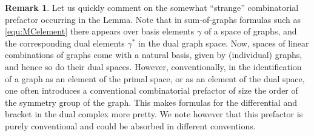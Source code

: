 \documentclass[a4paper]{amsart}
\theoremstyle{plain}
\theoremstyle{definition}
\newtheorem{rem}[thm]{Remark}
\begin{document}
\begin{rem}
 Let us quickly comment on the somewhat ``strange'' combinatorial prefactor occurring in the Lemma.
Note that in sum-of-graphs formulas such as \eqref{equ:MCelement} there appears over basis elements $\gamma$ of a space of graphs, and the corresponding dual elements $\gamma^*$ in the dual graph space.
Now, spaces of linear combinations of graphs come with a natural basis, given by (individual) graphs, and hence so do their dual spaces.
However, conventionally, in the identification of a graph as an element of the primal space, or as an element of the dual space, one often introduces a conventional combinatorial prefactor of size the order of the symmetry group of the graph.
This makes formulas for the differential and bracket in the dual complex more pretty.
We note however that this prefactor is purely conventional and could be absorbed in different conventions.
\end{rem}


% 
% 
\end{document}
